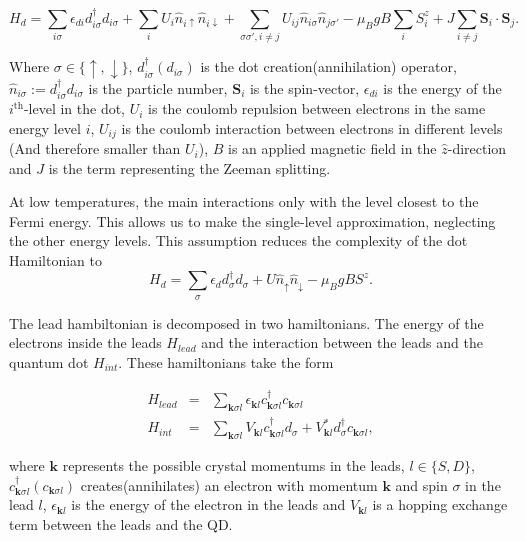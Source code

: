 \[
H_{d}=\sum_{i\sigma}\epsilon_{di}d_{i\sigma}^{\dagger}d_{i\sigma}+\sum_{i}U_{i}\hat{n}_{i\uparrow}\hat{n}_{i\downarrow}+\sum_{\sigma\sigma',i\neq j}U_{ij}\hat{n}_{i\sigma}\hat{n}_{j\sigma'}-\mu_{B}gB\sum_{i}S_{i}^{z}+J\sum_{i\neq j}\mathbf{S}_{i}\cdot\mathbf{S}_{j}.
\]


Where $\sigma\in\{\uparrow,\downarrow\}$, $d_{i\sigma}^{\dagger}\left(d_{i\sigma}\right)$
is the dot creation(annihilation) operator,$\hat{n}_{i\sigma}:=d_{i\sigma}^{\dagger}d_{i\sigma}$
is the particle number, $\mathbf{S}_{i}$ is the spin-vector, $\epsilon_{di}$
is the energy of the $i^{\mbox{th}}$-level in the dot, $U_{i}$ is
the coulomb repulsion between electrons in the same energy level $i$,
$U_{ij}$ is the coulomb interaction between electrons in different
levels (And therefore smaller than $U_{i}$), \textbf{$B$} is an
applied magnetic field in the $\hat{z}$-direction and $J$ is the
term representing the Zeeman splitting. 

At low temperatures, the main interactions only with the level closest to the Fermi energy. This allows us to make the single-level approximation, neglecting the other energy levels. This assumption reduces the complexity of the dot Hamiltonian to \\


\begin{equation}
    H_{d}=\sum_{\sigma}\epsilon_{d}d_{\sigma}^{\dagger}d_{\sigma}+U\hat{n}_{\uparrow}\hat{n}_{\downarrow}-\mu_{B}gBS^{z}. \label{eq:hdot}
\end{equation}





The lead hambiltonian is decomposed in two hamiltonians. The energy of the electrons inside the leads $H_{lead}$ and the interaction between the leads and the quantum dot $H_{int}$. These hamiltonians take the form 

\begin{eqnarray*}
H_{lead} & = & \sum_{\mathbf{k}\sigma l}\epsilon_{\mathbf{k}l}c_{\mathbf{k}\sigma l}^{\dagger}c_{\mathbf{k}\sigma l}\\
H_{int} & = & \sum_{\mathbf{k}\sigma l}V_{\mathbf{k}l}c_{\mathbf{k}\sigma l}^{\dagger}d_{\sigma}+V_{\mathbf{k}l}^{*}d_{\sigma}^{\dagger}c_{\mathbf{k}\sigma l},
\end{eqnarray*}


where $\mathbf{k}$ represents the possible crystal momentums in the
leads, $l\in\{S,D\}$, $c_{\mathbf{k}\sigma l}^{\dagger}(c_{\mathbf{k}\sigma l})$
creates(annihilates) an electron with momentum $\mathbf{k}$ and spin
$\sigma$ in the lead $l$, $\epsilon_{\mathbf{k}l}$ is the energy
of the electron in the leads and $V_{\mathbf{k}l}$ is a hopping exchange
term between the leads and the QD. 


